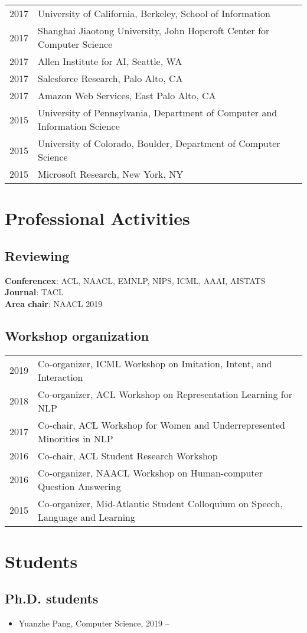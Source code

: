 \documentclass[a4paper,11pt]{article}
\begin{document}
\begin{longtable}{rl}
    2017 & University of California, Berkeley, School of Information \\
    2017 & Shanghai Jiaotong University, John Hopcroft Center for Computer Science \\
    2017 & Allen Institute for AI, Seattle, WA \\
    2017 & Salesforce Research, Palo Alto, CA \\
    2017 & Amazon Web Services, East Palo Alto, CA \\
    2015 & University of Pennsylvania, Department of Computer and Information Science \\
    2015 & University of Colorado, Boulder, Department of Computer Science \\
    2015 & Microsoft Research, New York, NY \\
\end{longtable}

\section{Professional Activities}
\subsection{Reviewing}
\textbf{Conferencex}: ACL, NAACL, EMNLP, NIPS, ICML, AAAI, AISTATS \\
\textbf{Journal}: TACL \\
\textbf{Area chair}: NAACL 2019

\subsection{Workshop organization}
\begin{longtable}{rl}
2019 & Co-organizer, ICML Workshop on Imitation, Intent, and Interaction \\
2018 & Co-organizer, ACL Workshop on Representation Learning for NLP \\
2017 & Co-chair, ACL Workshop for Women and Underrepresented Minorities in NLP \\
2016 & Co-chair, ACL Student Research Workshop \\
2016 & Co-organizer, NAACL Workshop on Human-computer Question Answering \\
2015 & Co-organizer, Mid-Atlantic Student Colloquium on Speech, Language and Learning
\end{longtable}

\section{Students}
\subsection{Ph.D. students}
\begin{itemize}
    \item Yuanzhe Pang, Computer Science, 2019 --
\end{itemize}
\end{document}
